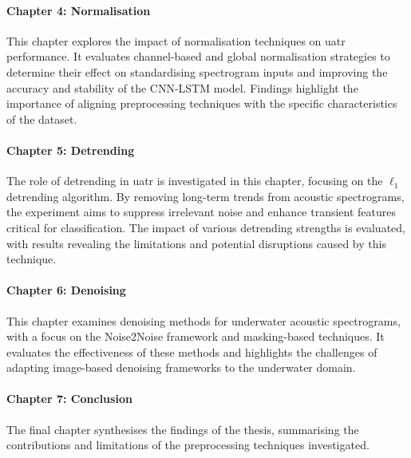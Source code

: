 \paragraph{Chapter 4: Normalisation}
This chapter explores the impact of normalisation techniques on \acrshort{uatr} performance. It evaluates channel-based and global normalisation strategies to determine their effect on standardising spectrogram inputs and improving the accuracy and stability of the CNN-LSTM model. Findings highlight the importance of aligning preprocessing techniques with the specific characteristics of the dataset.

\paragraph{Chapter 5: Detrending} 
The role of detrending in \acrshort{uatr} is investigated in this chapter, focusing on the $\ell_1$ detrending algorithm. By removing long-term trends from acoustic spectrograms, the experiment aims to suppress irrelevant noise and enhance transient features critical for classification. The impact of various detrending strengths is evaluated, with results revealing the limitations and potential disruptions caused by this technique.

\paragraph{Chapter 6: Denoising}
This chapter examines denoising methods for underwater acoustic spectrograms, with a focus on the Noise2Noise framework and masking-based techniques. It evaluates the effectiveness of these methods and highlights the challenges of adapting image-based denoising frameworks to the underwater domain.

\paragraph{Chapter 7: Conclusion}
The final chapter synthesises the findings of the thesis, summarising the contributions and limitations of the preprocessing techniques investigated.